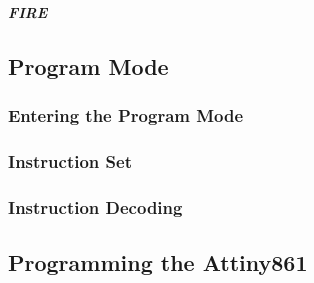 \paragraph{\textit{FIRE}}
\subsection{Program Mode}
\label{Program Mode}
\subsubsection{Entering the Program Mode}
\subsubsection{Instruction Set}
\subsubsection{Instruction Decoding}


\subsection{Programming the Attiny861}
\label{Programming the Attiny861}


\pagebreak


%




